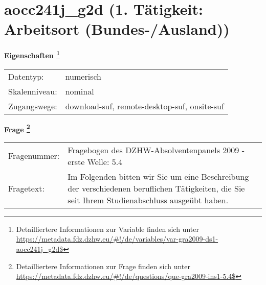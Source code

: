 
    \setcounter{footnote}{0}

    \vspace*{-1.8cm}
	\section{aocc241j\_g2d (1. Tätigkeit: Arbeitsort (Bundes-/Ausland))}
	\label{section:aocc241j_g2d}



    \vspace*{0.5cm}
    \noindent\textbf{Eigenschaften
	\footnote{Detailliertere Informationen zur Variable finden sich unter
		\url{https://metadata.fdz.dzhw.eu/\#!/de/variables/var-gra2009-ds1-aocc241j_g2d$}}}\\
	\begin{tabularx}{\hsize}{@{}lX}
	Datentyp: & numerisch \\
	Skalenniveau: & nominal \\
	Zugangswege: &
	  download-suf, 
	  remote-desktop-suf, 
	  onsite-suf
 \\
    \end{tabularx}



				\vspace*{0.5cm}
                \noindent\textbf{Frage
	                \footnote{Detailliertere Informationen zur Frage finden sich unter
		              \url{https://metadata.fdz.dzhw.eu/\#!/de/questions/que-gra2009-ins1-5.4$}}}\\
				\begin{tabularx}{\hsize}{@{}lX}
					Fragenummer: &
					  Fragebogen des DZHW-Absolventenpanels 2009 - erste Welle:
					  5.4
 \\
					Fragetext: & Im Folgenden bitten wir Sie um eine Beschreibung der verschiedenen beruflichen Tätigkeiten, die Sie seit Ihrem Studienabschluss ausgeübt haben. \\
				\end{tabularx}





